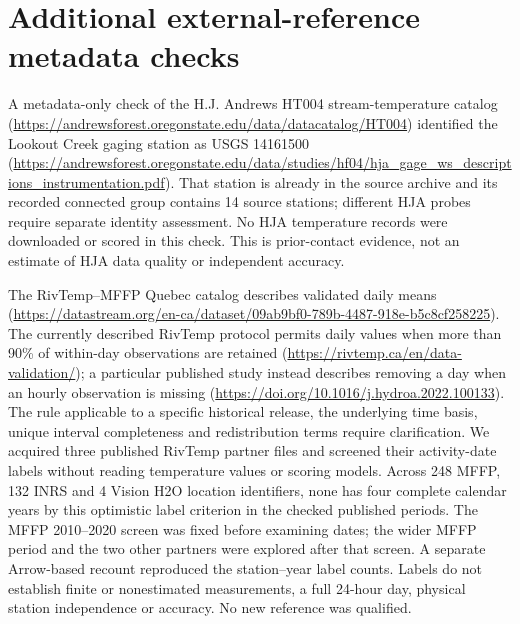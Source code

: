 \documentclass[draft]{agujournal2025}
\begin{document}
\section{Additional external-reference metadata checks}
A metadata-only check of the H.J. Andrews HT004 stream-temperature catalog (\url{https://andrewsforest.oregonstate.edu/data/datacatalog/HT004}) identified the Lookout Creek gaging station as USGS 14161500 (\url{https://andrewsforest.oregonstate.edu/data/studies/hf04/hja_gage_ws_descriptions_instrumentation.pdf}). That station is already in the source archive and its recorded connected group contains 14 source stations; different HJA probes require separate identity assessment. No HJA temperature records were downloaded or scored in this check. This is prior-contact evidence, not an estimate of HJA data quality or independent accuracy.

The RivTemp--MFFP Quebec catalog describes validated daily means (\url{https://datastream.org/en-ca/dataset/09ab9bf0-789b-4487-918e-b5c8cf258225}). The currently described RivTemp protocol permits daily values when more than 90\% of within-day observations are retained (\url{https://rivtemp.ca/en/data-validation/}); a particular published study instead describes removing a day when an hourly observation is missing (\url{https://doi.org/10.1016/j.hydroa.2022.100133}). The rule applicable to a specific historical release, the underlying time basis, unique interval completeness and redistribution terms require clarification. We acquired three published RivTemp partner files and screened their activity-date labels without reading temperature values or scoring models. Across 248 MFFP, 132 INRS and 4 Vision H2O location identifiers, none has four complete calendar years by this optimistic label criterion in the checked published periods. The MFFP 2010--2020 screen was fixed before examining dates; the wider MFFP period and the two other partners were explored after that screen. A separate Arrow-based recount reproduced the station--year label counts. Labels do not establish finite or nonestimated measurements, a full 24-hour day, physical station independence or accuracy. No new reference was qualified.





\end{document}
